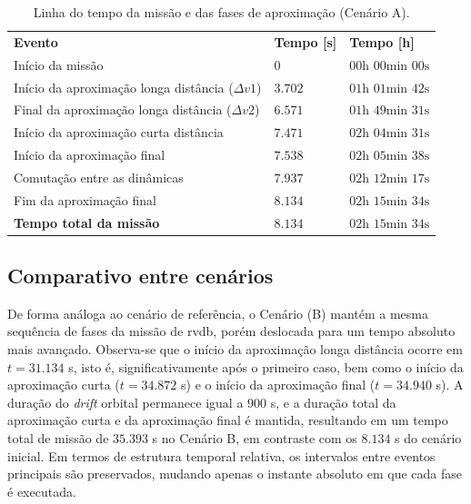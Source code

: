 \begin{table}[H]
\centering
\caption{Linha do tempo da missão e das fases de aproximação (Cenário A).}
\label{tab_cap4_linha_tempo}
\begin{tabularx}{\linewidth}{|
  >{\raggedright\arraybackslash}X|
  >{\centering\arraybackslash}X|
  >{\centering\arraybackslash}X|}
\hline
\textbf{Evento} &
\textbf{Tempo [s]} &
\textbf{Tempo [h]} \\
\hhline{|=|=|=|}
Início da missão &
$0$ & $00\text{h }00\text{min }00\text{s}$ \\
\hline
Início da aproximação longa distância ($\Delta v1$) & $3.702$ & $01\text{h }01\text{min }42\text{s}$ \\
\hline
Final da aproximação longa distância ($\Delta v2$) & $6.571$ & $01\text{h }49\text{min }31\text{s}$ \\
\hline
Início da aproximação curta distância &$7.471$ & $02\text{h }04\text{min }31\text{s}$ \\
\hline
Início da aproximação final & $7.538$ & $02\text{h }05\text{min }38\text{s}$ \\
\hline
Comutação entre as dinâmicas & $7.937$ & $02\text{h }12\text{min }17\text{s}$ \\
\hline
Fim da aproximação final & $8.134$ & $02\text{h }15\text{min }34\text{s}$ \\
\hline
\textbf{Tempo total da missão} & $8.134$ & $02\text{h }15\text{min }34\text{s}$ \\
\hline
\end{tabularx}
\end{table}

\subsection{Comparativo entre cenários}

De forma análoga ao cenário de referência, o Cenário (B) mantém a mesma sequência de fases da missão de \gls{rvdb}, porém deslocada para um tempo absoluto mais avançado.
Observa-se que o início da aproximação longa distância ocorre em $t = 31.134$ s, isto é, significativamente após o primeiro caso, bem como o início da aproximação curta ($t = 34.872$ s) e o início da aproximação final ($t = 34.940$ s). A duração do \emph{drift} orbital permanece igual a $900$ s, e a duração total da aproximação curta e da aproximação final é mantida, resultando em um tempo total de missão de $35.393$ s no Cenário B, em contraste com os $8.134$ s do cenário inicial.
Em termos de estrutura temporal relativa, os intervalos entre eventos principais são preservados, mudando apenas o instante absoluto em que cada fase é executada.

